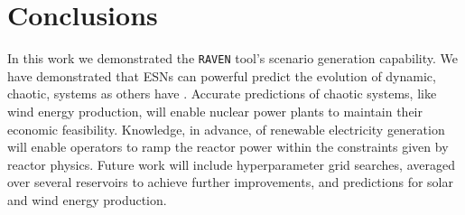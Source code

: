 \section{Conclusions}

In this work we demonstrated the \texttt{RAVEN} tool's scenario generation
capability. We have demonstrated that \acrlong{ESN}s can
powerful predict the evolution of dynamic, chaotic, systems as others have
\cite{pathak_model-free_2018,wikner_combining_2020,bianchi_reservoir_2020}.
Accurate predictions of chaotic systems, like wind energy production, will
enable nuclear power plants to maintain their economic feasibility.
Knowledge, in advance, of renewable electricity generation will enable
operators to ramp the reactor power within the constraints given by reactor
physics. Future work will include hyperparameter grid searches, averaged over
several reservoirs to achieve further improvements, and predictions for solar
and wind energy production.
